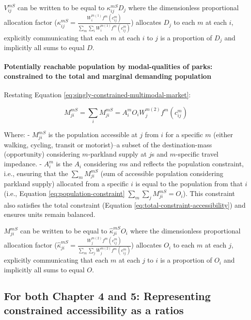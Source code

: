 \documentclass[
11pt, %
oneside, %
english, %
singlespacing, %
]{macthesis} %
\begin{document}
\(V_{ij}^{mS}\) can be written to be equal to \(\kappa_{ij}^{mS} D_j\) where the dimensionless proportional allocation factor (\(\kappa_{ij}^{mS} = \frac{W_i^{m(1)} f^m(c^m_{ij})}{\sum_m\sum_i W_i^{m(1)} f^m(c^m_{ij})}\)) allocates \(D_j\) to each \(m\) at each \(i\), explicitly communicating that each \(m\) at each \(i\) to \(j\) is a proportion of \(D_j\) and implicitly all sums to equal \(D\).

\paragraph{Potentially reachable population by modal-qualities of parks: constrained to the total and marginal demanding population}\label{potentially-reachable-population-by-modal-qualities-of-parks-constrained-to-the-total-and-marginal-demanding-population}

Restating Equation \ref{eq:singly-constrained-multimodal-market}:

\begin{equation}
\label{eq:singly-constrained-multimodal-market}
M^{mS}_{ji} = \sum_i M^{mS}_{ji} = A_i^{m} O_i W_j^{m(2)} f^m(c^m_{ij})
\end{equation} 

Where:
- \(M^{mS}_{ji}\) is the population accessible at \(j\) from \(i\) for a specific \(m\) (either walking, cycling, transit or motorist)--a subset of the destination-mass (opportunity) considering \(m\)-parkland supply at \(j\)s and \(m\)-specific travel impedance.
- \(A_i^{m}\) is the \(A_i\) considering \(m\)s and reflects the population constraint, i.e., ensuring that the \(\sum_m M^{mS}_{ji}\) (sum of accessible population considering parkland supply) allocated from a specific \(i\) is equal to the population from that \(i\) (i.e., Equation \ref{eq:population-constraint} \(\sum_m \sum_j M^{mS}_{ji} =  O_i\)). This constraint also satisfies the total constraint (Equation \ref{eq:total-constraint-accessibility}) and ensures units remain balanced.

\(M_{ji}^{mS}\) can be written to be equal to \(\hat \kappa_{ji}^{mS} O_i\) where the dimensionless proportional allocation factor (\(\hat \kappa_{ji}^{mS} =  \frac{W_j^{m(2)} f^m(c^m_{ij})}{\sum_m\sum_j W_j^{m(2)} f^m(c^m_{ij})}\)) allocates \(O_i\) to each \(m\) at each \(j\), explicitly communicating that each \(m\) at each \(j\) to \(i\) is a proportion of \(O_i\) and implicitly all sums to equal \(O\).

\subsection{For both Chapter 4 and 5: Representing constrained accessibility as a ratios}\label{for-both-chapter-4-and-5-representing-constrained-accessibility-as-a-ratios}
\end{document}
